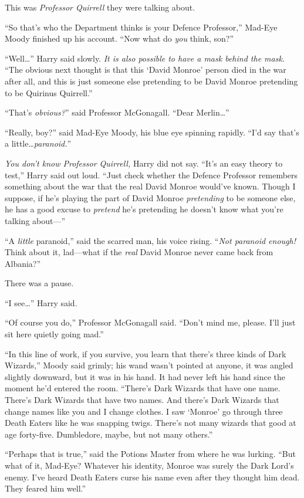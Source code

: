 This was \emph{Professor Quirrell} they were talking about.

“So that’s who the Department thinks is your Defence Professor,” Mad-Eye Moody finished up his account. “Now what do \emph{you} think, son?”

“Well…” Harry said slowly. \emph{It is also possible to have a mask behind the mask.} “The obvious next thought is that this ‘David Monroe’ person died in the war after all, and this is just someone else pretending to be David Monroe pretending to be Quirinus Quirrell.”

“That’s \emph{obvious?}” said Professor McGonagall. “Dear Merlin…”

“Really, boy?” said Mad-Eye Moody, his blue eye spinning rapidly. “I’d say that’s a little…\emph{paranoid.}”

\emph{You don’t know Professor Quirrell,} Harry did not say. “It’s an easy theory to test,” Harry said out loud. “Just check whether the Defence Professor remembers something about the war that the real David Monroe would’ve known. Though I suppose, if he’s playing the part of David Monroe \emph{pretending} to be someone else, he has a good excuse to \emph{pretend} he’s pretending he doesn’t know what you’re talking about—”

“A \emph{little} paranoid,” said the scarred man, his voice rising. “\emph{Not paranoid enough! } Think about it, lad—what if the \emph{real} David Monroe never came back from Albania?”

There was a pause.

“I see…” Harry said.

“Of course you do,” Professor McGonagall said. “Don’t mind me, please. I’ll just sit here quietly going mad.”

“In this line of work, if you survive, you learn that there’s three kinds of Dark Wizards,” Moody said grimly; his wand wasn’t pointed at anyone, it was angled slightly downward, but it was in his hand. It had never left his hand since the moment he’d entered the room. “There’s Dark Wizards that have one name. There’s Dark Wizards that have two names. And there’s Dark Wizards that change names like you and I change clothes. I saw ‘Monroe’ go through three Death Eaters like he was snapping twigs. There’s not many wizards that good at age forty-five. Dumbledore, maybe, but not many others.”

“Perhaps that is true,” said the Potions Master from where he was lurking. “But what of it, Mad-Eye? Whatever his identity, Monroe was surely the Dark Lord’s enemy. I’ve heard Death Eaters curse his name even after they thought him dead. They feared him well.”

